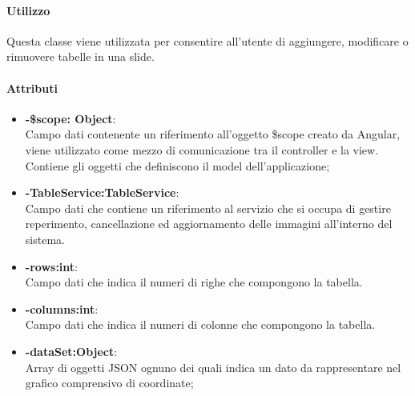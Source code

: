 	\paragraph{Utilizzo}
	Questa classe viene utilizzata per consentire all'utente di aggiungere, modificare o rimuovere tabelle in una slide.
	
	\paragraph{Attributi}
	\begin{itemize}
		\item \textbf{-\$scope: Object}:\\
			Campo dati contenente un riferimento all'oggetto \$scope creato da Angular, viene utilizzato come mezzo di comunicazione tra il controller e la view. Contiene gli oggetti che definiscono il model dell'applicazione;
		\item  \textbf{-TableService:TableService}:\\
			Campo dati che contiene un riferimento al servizio che si occupa di gestire reperimento, cancellazione ed aggiornamento delle immagini all'interno del sistema.
		\item\textbf{-rows:int}:\\
			Campo dati che indica il numeri di righe che compongono la tabella.
		\item\textbf{-columns:int}:\\
			Campo dati che indica il numeri di colonne che compongono la tabella.
		\item\textbf{-dataSet:Object}:\\
			Array di oggetti JSON ognuno dei quali indica un dato da rappresentare nel grafico comprensivo di coordinate;
	\end{itemize}
	
